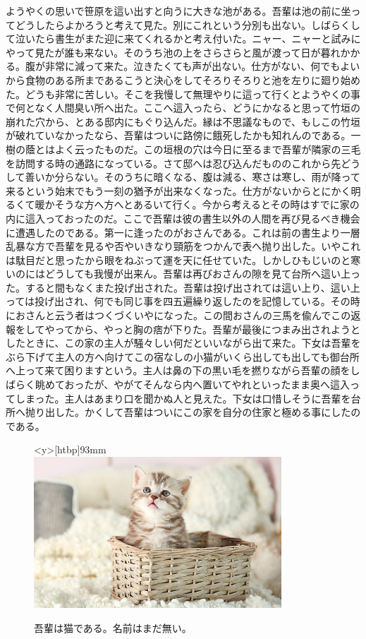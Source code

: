 \documentclass[]{ltjtbook}
\begin{document}
ようやくの思いで笹原を這い出すと向うに大きな池がある。吾輩は池の前に坐ってどうしたらよかろうと考えて見た。別にこれという分別も出ない。しばらくして泣いたら書生がまた迎に来てくれるかと考え付いた。ニャー、ニャーと試みにやって見たが誰も来ない。そのうち池の上をさらさらと風が渡って日が暮れかかる。腹が非常に減って来た。泣きたくても声が出ない。仕方がない、何でもよいから食物のある所まであるこうと決心をしてそろりそろりと池を左りに廻り始めた。どうも非常に苦しい。そこを我慢して無理やりに這って行くとようやくの事で何となく人間臭い所へ出た。ここへ這入ったら、どうにかなると思って竹垣の崩れた穴から、とある邸内にもぐり込んだ。縁は不思議なもので、もしこの竹垣が破れていなかったなら、吾輩はついに路傍に餓死したかも知れんのである。一樹の蔭とはよく云ったものだ。この垣根の穴は今日に至るまで吾輩が隣家の三毛を訪問する時の通路になっている。さて邸へは忍び込んだもののこれから先どうして善いか分らない。そのうちに暗くなる、腹は減る、寒さは寒し、雨が降って来るという始末でもう一刻の猶予が出来なくなった。仕方がないからとにかく明るくて暖かそうな方へ方へとあるいて行く。今から考えるとその時はすでに家の内に這入っておったのだ。ここで吾輩は彼の書生以外の人間を再び見るべき機会に遭遇したのである。第一に逢ったのがおさんである。これは前の書生より一層乱暴な方で吾輩を見るや否やいきなり頸筋をつかんで表へ抛り出した。いやこれは駄目だと思ったから眼をねぶって運を天に任せていた。しかしひもじいのと寒いのにはどうしても我慢が出来ん。吾輩は再びおさんの隙を見て台所へ這い上った。すると間もなくまた投げ出された。吾輩は投げ出されては這い上り、這い上っては投げ出され、何でも同じ事を四五遍繰り返したのを記憶している。その時におさんと云う者はつくづくいやになった。この間おさんの三馬を偸んでこの返報をしてやってから、やっと胸の痞が下りた。吾輩が最後につまみ出されようとしたときに、この家の主人が騒々しい何だといいながら出て来た。下女は吾輩をぶら下げて主人の方へ向けてこの宿なしの小猫がいくら出しても出しても御台所へ上って来て困りますという。主人は鼻の下の黒い毛を撚りながら吾輩の顔をしばらく眺めておったが、やがてそんなら内へ置いてやれといったまま奥へ這入ってしまった。主人はあまり口を聞かぬ人と見えた。下女は口惜しそうに吾輩を台所へ抛り出した。かくして吾輩はついにこの家を自分の住家と極める事にしたのである。

\begin{figure}
\begin{center}
\begin{minipage}<y>[htbp]{93mm}
\centering
\includegraphics[width=93mm]{./pic/cat002.jpg}
\caption{吾輩は猫である。名前はまだ無い。}
\end{minipage}
\end{center}
\end{figure}
\end{document}
